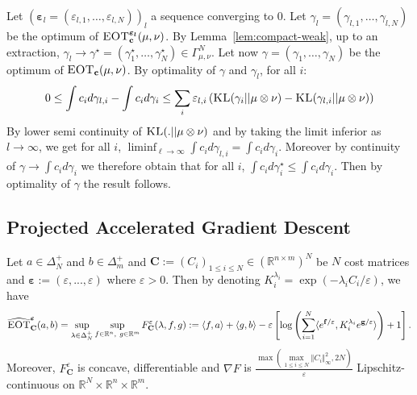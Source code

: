 \begin{prv*}
Let $(\bm{\varepsilon}_l=(\varepsilon_{l,1},\dots,\varepsilon_{l,N}))_l$ a sequence converging to $0$. Let $\gamma_l = (\gamma_{l,1},\dots,\gamma_{l,N})$ be the optimum of $\textsc{EOT}^{\bm{\varepsilon_l}}_\mathbf{c}(\mu,\nu)$. By Lemma~\ref{lem:compact-weak}, up to an extraction, $\gamma_l\rightarrow \gamma^\star=(\gamma^\star_{1},\dots,\gamma^\star_{N})\in\Gamma^N_{\mu,\nu}$. Let now $\gamma=(\gamma_{1},\dots,\gamma_{N})$ be the optimum of $\textsc{EOT}_\mathbf{c}(\mu,\nu)$. By optimality of $\gamma$ and $\gamma_l$, for all $i$: \begin{align*}
    0\leq  \int c_id\gamma_{l,i}-\int c_id\gamma_{i}\leq\sum_i\varepsilon_{l,i}\left(\textsc{KL}(\gamma_{i}||\mu\otimes\nu)-\textsc{KL}(\gamma_{l,i}||\mu\otimes\nu)\right)
\end{align*}
By lower semi continuity of $\textsc{KL}(.||\mu\otimes\nu)$ and by taking the limit inferior as $l\to\infty$, we get for all $i$, $\liminf_{\ell\rightarrow\infty} \int c_id\gamma_{l,i}=\int c_id\gamma_{i}$. Moreover by continuity of $\gamma\rightarrow \int c_i d\gamma_i$  we therefore obtain that for all $i$, $\int c_id\gamma^\star_{i}\leq \int c_id\gamma_{i}$. Then by optimality of $\gamma$ the result follows.
\end{prv*}


\subsection{Projected Accelerated Gradient Descent}
\label{res:pgd}


\begin{prop}
\label{prop:algo-dual}
Let $a\in\Delta_N^{+}$ and $b\in\Delta^+_m$ and $\mathbf{C}:=(C_i)_{1\leq i\leq N}\in\left(\mathbb{R}^{n\times m}\right)^N$ be $N$ cost matrices and $\bm{\varepsilon}:=(\varepsilon,...,\varepsilon)$ where $\varepsilon>0$. Then by denoting $K_i^{\lambda_i} =\exp\left(-\lambda_i C_{i}/\varepsilon\right)$, we have
\begin{align*}
\widehat{\textsc{EOT}}_{\mathbf{C}}^{\bm{\varepsilon}}(a,b)=\sup_{\lambda\in\Delta^+_N}\sup\limits_{f\in \mathbb{R}^n,~g\in \mathbb{R}^m} F_{\mathbf{C}}^{\varepsilon}(\lambda,f,g):= \langle f, a\rangle+\langle g,b\rangle -\varepsilon\left[\log\left(\sum_{i=1}^N\langle e^{\mathbf{f}/\varepsilon},K_i^{\lambda_i} e^{\mathbf{g}/\varepsilon}\rangle \right) + 1\right].
\end{align*}
Moreover, $F_{\mathbf{C}}^{\varepsilon}$ is concave, differentiable and $\nabla F$ is $\frac{\max\left(\max\limits_{1\leq i\leq N}\Vert C_i\Vert_{\infty}^2,2N\right)}{\varepsilon}$ Lipschitz-continuous on $\mathbb{R}^N\times \mathbb{R}^n \times\mathbb{R}^m$.
\end{prop}



